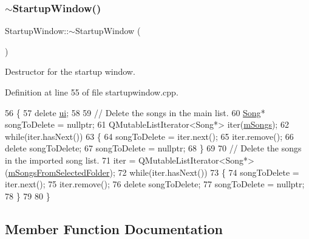 \subsubsection{\texorpdfstring{$\sim$\+Startup\+Window()}{~StartupWindow()}}
{\footnotesize\ttfamily Startup\+Window\+::$\sim$\+Startup\+Window (\begin{DoxyParamCaption}{ }\end{DoxyParamCaption})}



Destructor for the startup window. 



Definition at line 55 of file startupwindow.\+cpp.


\begin{DoxyCode}
56 \{
57     \textcolor{keyword}{delete} \mbox{\hyperlink{class_startup_window_a5afeeaabe9a34a02a67d2e7d9f36dc09}{ui}};
58 
59     \textcolor{comment}{// Delete the songs in the main list.}
60     \mbox{\hyperlink{class_song}{Song}}* songToDelete = \textcolor{keyword}{nullptr};
61     QMutableListIterator<Song*> iter(\mbox{\hyperlink{class_startup_window_ae57241505d74639131cb0ece2cfc922b}{mSongs}});
62     \textcolor{keywordflow}{while}(iter.hasNext())
63     \{
64         songToDelete = iter.next();
65         iter.remove();
66         \textcolor{keyword}{delete} songToDelete;
67         songToDelete = \textcolor{keyword}{nullptr};
68     \}
69 
70     \textcolor{comment}{// Delete the songs in the imported song list.}
71     iter = QMutableListIterator<Song*>(\mbox{\hyperlink{class_startup_window_af419f4809f6fae0b370f1d9112dae9b4}{mSongsFromSelectedFolder}});
72     \textcolor{keywordflow}{while}(iter.hasNext())
73     \{
74         songToDelete = iter.next();
75         iter.remove();
76         \textcolor{keyword}{delete} songToDelete;
77         songToDelete = \textcolor{keyword}{nullptr};
78     \}
79 
80 \}
\end{DoxyCode}


\subsection{Member Function Documentation}
\mbox{\label{class_startup_window_a8b611329fddb960c3c27c54f7d5bf060}} 
